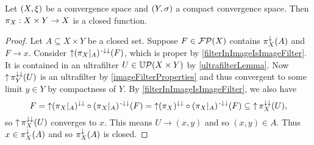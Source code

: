 \begin{lemma} \label{projectionClosedFunction}
Let $\sSet{X,\xi}$ be a convergence space and $\sSet{Y,\sigma}$ a compact convergence space. Then $\pi_X: X\times Y\to X$ is a closed function.
\end{lemma}
\begin{proof}
Let $A\subseteq X\times Y$ be a closed set. Suppose $F\in \operatorname{\mathcal{FP}}(X)$ contains $\pi_X^\downarrow(A)$ and $F\to x$. Consider $\operatorname{\uparrow}(\pi_X|_A)^{{\text{\hspace{0.15em}-}\downarrow}\downarrow}(F)$, which is proper by \ref{filterInImageIsImageFilter}. It is contained in an ultrafilter $U\in\operatorname{\mathbb{U}\mathcal{P}}(X\times Y)$ by \ref{ultrafilterLemma}. Now $\operatorname{\uparrow}\pi_Y^{\downarrow\downarrow}(U)$ is an ultrafilter by \ref{imageFilterProperties} and thus convergent to some limit $y\in Y$ by compactness of $Y$. By \ref{filterInImageIsImageFilter}, we also have
\[ F = \operatorname{\uparrow}(\pi_X|_A)^{\downarrow\downarrow}\circ(\pi_X|_A)^{{\text{\hspace{0.15em}-}\downarrow}\downarrow}(F) = \operatorname{\uparrow}(\pi_X)^{\downarrow\downarrow}\circ(\pi_X|_A)^{{\text{\hspace{0.15em}-}\downarrow}\downarrow}(F) \subseteq \operatorname{\uparrow}\pi_X^{\downarrow\downarrow}(U), \]
so $\operatorname{\uparrow}\pi_X^{\downarrow\downarrow}(U)$ converges to $x$. This means $U\to (x,y)$ and so $(x,y)\in A$. Thus $x\in \pi_X^\downarrow(A)$ and so $\pi_X^\downarrow(A)$ is closed.
\end{proof}

